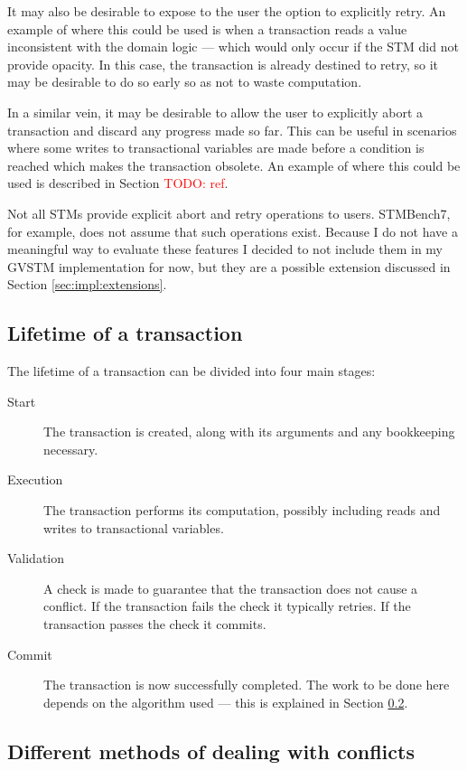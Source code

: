 \documentclass[12pt,a4paper,oneside,openright]{report}
\newcommand{\todo}[1]{\textcolor{red}{TODO: #1}}
\begin{document}
It may also be desirable to expose to the user the option to
explicitly retry. An example of where this could be used is when a
transaction reads a value inconsistent with the domain logic --- which
would only occur if the STM did not provide opacity. In this case, the
transaction is already destined to retry, so it may be desirable to do
so early so as not to waste computation.

In a similar vein, it may be desirable to allow the user to explicitly
abort a transaction and discard any progress made so far. This can be
useful in scenarios where some writes to transactional variables are
made before a condition is reached which makes the transaction
obsolete. An example of where this could be used is described in
Section \todo{ref}.

Not all STMs provide explicit abort and retry operations to
users. STMBench7, for example, does not assume that such operations
exist. Because I do not have a meaningful way to evaluate these
features I decided to not include them in my GVSTM implementation for
now, but they are a possible extension discussed in Section
\ref{sec:impl:extensions}.

\subsection{Lifetime of a transaction}
\label{sec:lifetime-transaction}

The lifetime of a transaction can be divided into four main stages:

\begin{description}
\item[Start] The transaction is created, along with its arguments and any
  bookkeeping necessary.
\item[Execution] The transaction performs its computation, possibly including reads
  and writes to transactional variables.
\item[Validation] A check is made to guarantee that the transaction does not cause a
  conflict. If the transaction fails the check it typically
  retries. If the transaction passes the check it commits.
\item[Commit] The transaction is now successfully completed. The work to be done
  here depends on the algorithm used --- this is explained in Section
  \ref{sec:impl:diff-meth-deal}.
\end{description}

\subsection{Different methods of dealing with conflicts}
\label{sec:impl:diff-meth-deal}
\end{document}
